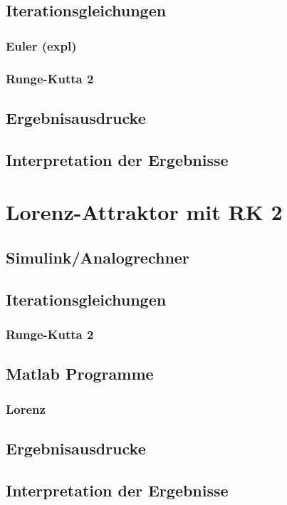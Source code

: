 \documentclass[10pt]{scrartcl}
\begin{document}
	\subsection{Iterationsgleichungen}
		\subsubsection{Euler (expl)}	
	
		\subsubsection{Runge-Kutta 2}	
		
	\subsection{Ergebnisausdrucke}	
		
	\subsection{Interpretation der Ergebnisse}	
	
\section{Lorenz-Attraktor mit RK 2}	
	\subsection{Simulink/Analogrechner}
	
	\subsection{Iterationsgleichungen}
		\subsubsection{Runge-Kutta 2}

	\subsection{Matlab Programme}
		\subsubsection{Lorenz}			

	\subsection{Ergebnisausdrucke}	
		
	\subsection{Interpretation der Ergebnisse}				
\end{document}
